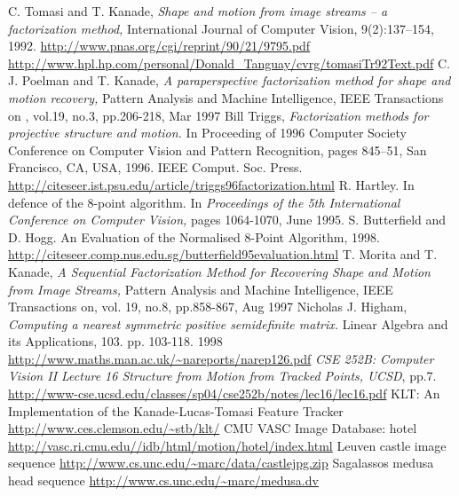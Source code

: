  \begin{thebibliography}{99}
  C. Tomasi and T. Kanade, \textit{Shape and motion from image streams -- a factorization method,}   International Journal of Computer Vision, 9(2):137--154, 1992. \url{http://www.pnas.org/cgi/reprint/90/21/9795.pdf} \url{http://www.hpl.hp.com/personal/Donald_Tanguay/cvrg/tomasiTr92Text.pdf}
 C. J. Poelman and T. Kanade, \textit{A paraperspective factorization method for shape and motion recovery,} Pattern Analysis and Machine Intelligence, IEEE Transactions on , vol.19, no.3, pp.206-218, Mar 1997
 Bill Triggs, \textit{Factorization methods for projective structure and motion.} In Proceeding of 1996 Computer Society Conference on Computer Vision and Pattern Recognition, pages 845--51, San Francisco, CA, USA, 1996. IEEE Comput. Soc. Press. \url{http://citeseer.ist.psu.edu/article/triggs96factorization.html}
  R. Hartley. In defence of the 8-point algorithm. In \textit{Proceedings of the 5th International Conference on Computer Vision, } pages 1064-1070, June 1995. 
  S. Butterfield and D. Hogg. An Evaluation of the Normalised 8-Point Algorithm, 1998. \url{http://citeseer.comp.nus.edu.sg/butterfield95evaluation.html}
 T. Morita and T. Kanade, \textit{A Sequential Factorization Method for Recovering Shape and Motion from Image Streams, } Pattern Analysis and Machine Intelligence, IEEE Transactions on, vol. 19, no.8, pp.858-867, Aug 1997
 Nicholas J. Higham, \textit{Computing a nearest symmetric positive semidefinite matrix.} Linear Algebra and its Applications, 103. pp. 103-118. 1998
\url{http://www.maths.man.ac.uk/~nareports/narep126.pdf}
 \textit{CSE 252B: Computer Vision II Lecture 16 Structure from Motion from Tracked Points, UCSD}, pp.7. \url{http://www-cse.ucsd.edu/classes/sp04/cse252b/notes/lec16/lec16.pdf}
  KLT: An Implementation of the
Kanade-Lucas-Tomasi Feature Tracker \url{http://www.ces.clemson.edu/~stb/klt/}
 CMU VASC Image Database: hotel \url{http://vasc.ri.cmu.edu//idb/html/motion/hotel/index.html}
 Leuven castle image sequence \url{http://www.cs.unc.edu/~marc/data/castlejpg.zip}
 Sagalassos medusa head sequence \url{http://www.cs.unc.edu/~marc/medusa.dv}

\end{thebibliography}



